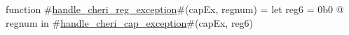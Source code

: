 function #\hyperref[sailRISCVzhandlezycherizyregzyexception]{handle\_cheri\_reg\_exception}#(capEx, regnum) =
  let reg6 = 0b0 @ regnum in
  #\hyperref[sailRISCVzhandlezycherizycapzyexception]{handle\_cheri\_cap\_exception}#(capEx, reg6)
